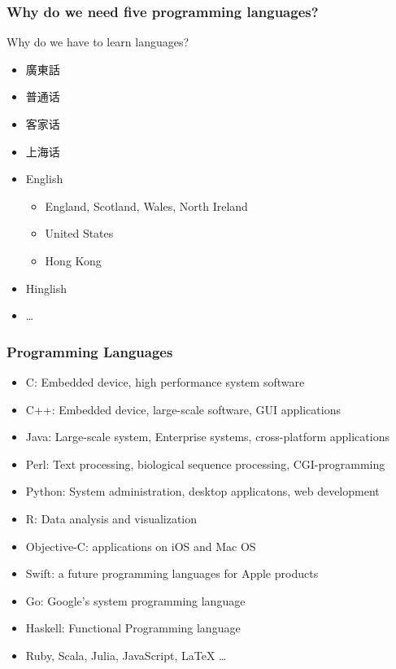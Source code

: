 \documentclass[UTF8]{beamer}
\begin{document}
\begin{frame}
  \frametitle{Why do we need five programming languages?}
  \begin{block}{Why do we have to learn languages?}
  \begin{itemize}
    \item 廣東話
    \item 普通话
    \item 客家话
    \item 上海话
    \item English
    \begin{itemize}
      \item England, Scotland, Wales, North Ireland
      \item United States
      \item Hong Kong
    \end{itemize}
    \item Hinglish
    \item \ldots
  \end{itemize}
\end{block}
\end{frame}

\begin{frame}
  \frametitle{Programming Languages}
  \tiny
  \begin{itemize}
    \item C: Embedded device, high performance system software
    \item C++: Embedded device, large-scale software, GUI applications
    \item Java: Large-scale system, Enterprise systems, cross-platform applications
    \item Perl: Text processing, biological sequence processing, CGI-programming
    \item Python: System administration, desktop applicatons, web development
    \item R: Data analysis and visualization
    \item Objective-C: applications on iOS and Mac OS
    \item Swift: a future programming languages for Apple products
    \item Go: Google's system programming language
    \item Haskell: Functional Programming language
    \item Ruby, Scala, Julia, JavaScript, LaTeX \ldots
  \end{itemize}
\end{frame}
\end{document}
